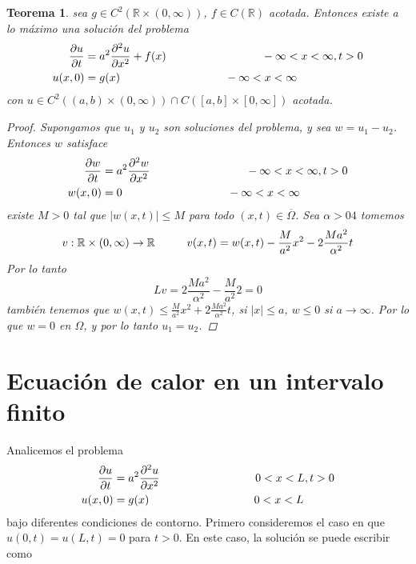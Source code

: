 \documentclass[11pt]{book}
\theoremstyle{plain}
\newtheorem{teo}[proposición]{Teorema}
\theoremstyle{definition}
\newcommand{\R}{\mathbb{R}}
\begin{document}
\begin{teo}
    sea $g \in C^{2}(\R\times(0,\infty))$, $f \in C(\R)$ acotada. Entonces existe a lo máximo una solución del problema
    \begin{align*}
        \frac{\partial u}{\partial t} &= a^{2} \frac{\partial^2 u}{\partial x^2} + f(x) \hspace{30mm} -\infty<x<\infty, t > 0\\ 
        u(x,0)&= g(x) \hspace{33mm} -\infty<x<\infty
    \end{align*}
    con $u \in C^{2}((a,b)\times(0,\infty))\cap C([a,b]\times[0,\infty])$ acotada.
    \begin{proof}
        Supongamos que $u_{1}$ y $u_{2}$ son soluciones del problema, y sea $w = u_{1} - u_{2}$. Entonces $w$ satisface
        \begin{align*}
            \frac{\partial w}{\partial t} &= a^{2} \frac{\partial^2 w}{\partial x^2} \hspace{30mm} -\infty<x<\infty, t > 0\\ 
            w(x,0)&= 0 \hspace{33mm} -\infty<x<\infty
        \end{align*}
        existe $M > 0$ tal que $|w(x,t)| \leq M$ para todo $(x,t) \in \overline{\Omega}$. Sea $\alpha > 04 $ tomemos
        \[
            v: \R\times(0,\infty) \to \R \hspace{10mm} v(x,t) = w(x,t) - \frac{M}{a^{2}}x^{2} -2\frac{Ma^{2}}{\alpha^{2}}t
        \]
        Por lo tanto 
        \[
            Lv = 2\frac{Ma^{2}}{\alpha^{2}} - \frac{M}{a^{2}}2 = 0
        \]
        también tenemos que $w(x,t) \leq \frac{M}{a^{2}}x^{2} +2\frac{Ma^{2}}{\alpha^{2}}t$, si $|x| \leq a$, $w \leq 0$ si $a\to\infty$. Por lo que $w = 0$ en $\Omega$, y por lo tanto $u_{1} = u_{2}$.
    \end{proof}
\end{teo}

\section{Ecuación de calor en un intervalo finito}
Analicemos el problema
\setcounter{equation}{0}
\begin{align}
    \frac{\partial u}{\partial t} &= a^{2} \frac{\partial^2 u}{\partial x^2} \hspace{30mm} 0<x<L, t > 0\\ 
    u(x,0)&= g(x) \hspace{33mm} 0<x<L
\end{align}
bajo diferentes condiciones de contorno. Primero consideremos el caso en que $u(0,t) = u(L,t) = 0$ para $t>0$. En este caso, la solución se puede escribir como
\end{document}

